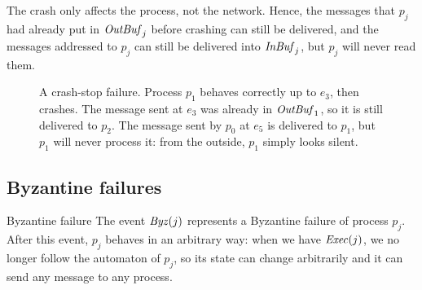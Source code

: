 The crash only affects the process, not the network. Hence, the messages that $p_j$ had already put in $\mathit{OutBuf}_j$ before crashing can still be delivered, and the messages addressed to $p_j$ can still be delivered into $\mathit{InBuf}_j$, but $p_j$ will never read them.

\begin{figure}[H]
  \centering
  \caption{A crash-stop failure. Process $p_1$ behaves correctly up to $e_3$, then crashes. The message sent at $e_3$ was already in $\mathit{OutBuf}_1$, so it is still delivered to $p_2$. The message sent by $p_0$ at $e_5$ is delivered to $p_1$, but $p_1$ will never process it: from the outside, $p_1$ simply looks silent.}
  \label{fig:crash}
\end{figure}

\subsection{Byzantine failures}

\begin{frameddefn}{Byzantine failure}
  The event $\mathit{Byz}(j)$ represents a Byzantine failure of process $p_j$. After this event, $p_j$ behaves in an arbitrary way: when we have $\mathit{Exec}(j)$, we no longer follow the automaton of $p_j$, so its state can change arbitrarily and it can send any message to any process.
\end{frameddefn}

